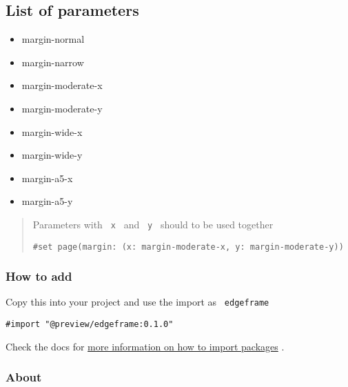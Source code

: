 \begin{Shaded}
\begin{Highlighting}[]
\end{Highlighting}
\end{Shaded}

\subsection{List of parameters}\label{list-of-parameters}

\begin{itemize}
\tightlist
\item
  margin-normal
\item
  margin-narrow
\item
  margin-moderate-x
\item
  margin-moderate-y
\item
  margin-wide-x
\item
  margin-wide-y
\item
  margin-a5-x
\item
  margin-a5-y
\end{itemize}

\begin{quote}
Parameters with \texttt{\ x\ } and \texttt{\ y\ } should to be used
together

\begin{verbatim}
#set page(margin: (x: margin-moderate-x, y: margin-moderate-y))
\end{verbatim}
\end{quote}

\subsubsection{How to add}\label{how-to-add}

Copy this into your project and use the import as \texttt{\ edgeframe\ }

\begin{verbatim}
#import "@preview/edgeframe:0.1.0"
\end{verbatim}



Check the docs for
\href{https://typst.app/docs/reference/scripting/\#packages}{more
information on how to import packages} .

\subsubsection{About}\label{about}

